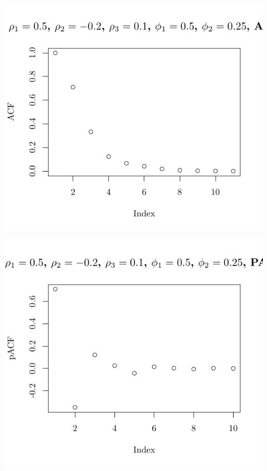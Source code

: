\documentclass[10pt]{paper}\usepackage[]{graphicx}\usepackage[]{color}
\makeatletter
\def\maxwidth{ %
  \ifdim\Gin@nat@width>\linewidth
    \linewidth
  \else
    \Gin@nat@width
  \fi
}
\newenvironment{knitrout}{}{} %
\makeatother
\begin{document}
\begin{knitrout}
{\centering \includegraphics[width=\maxwidth]{figure/graphics-plotter-191} 

}




{\centering \includegraphics[width=\maxwidth]{figure/graphics-plotter-192} 

}





\end{knitrout}
\end{document}
